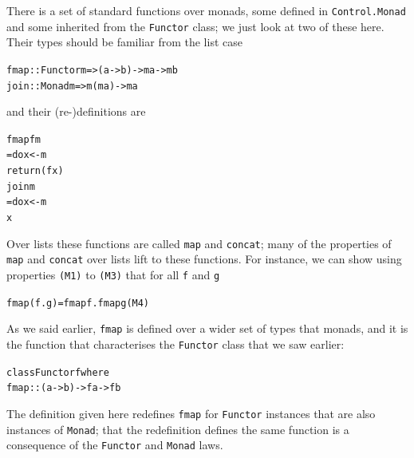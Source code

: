 There is a set of standard functions over monads, some defined in \texttt{Control.Monad} and some inherited from the \texttt{Functor} class; we just look at two of these here. Their types should be
familiar from the list case
\begin{alltt}
fmap :: Functor m => (a -> b) -> m a -> m b
join :: Monad m => m (m a) -> m a
\end{alltt}
and their (re-)definitions are
\begin{alltt}
fmap f m 
  = do x <- m 
       return (f x)
join m  
  = do x <- m
       x
\end{alltt}
Over lists these functions are called \texttt{map} and \texttt{concat};
many of the properties of \texttt{map} and \texttt{concat} over lists lift to these
functions. For instance, we can show using properties \texttt{(M1)} to \texttt{(M3)}
that for all \texttt{f} and \texttt{g}
\begin{alltt}
fmap (f.g) = fmap f . fmap g\hfill(M4)
\end{alltt}
As we said earlier, \texttt{fmap} is defined over a wider set of types that monads, and it is the function that characterises the \texttt{Functor} class that we saw earlier:
\begin{alltt}
class Functor f where
  fmap :: (a -> b) -> f a -> f b
\end{alltt}
The definition given here redefines \texttt{fmap} for \texttt{Functor} instances that are also instances of \texttt{Monad}; that the redefinition defines the same function is a consequence of the \texttt{Functor} and \texttt{Monad} laws.

